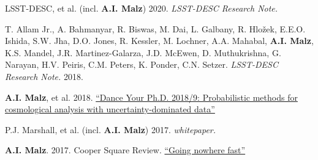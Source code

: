 \nopagebreak\begin{list}{}{\malzlist}
	
		\item LSST-DESC, et al. (incl. {\bf A.I. Malz}) 2020. {\em LSST-DESC Research Note.}  
	
	\item T. Allam Jr., A. Bahmanyar, R. Biswas, M. Dai, L. Galbany, R. Hlo{\v z}ek, E.E.O. Ishida, S.W. Jha, D.O. Jones, R. Kessler, M. Lochner, A.A. Mahabal, {\bf A.I. Malz}, K.S. Mandel, J.R. Martinez-Galarza, J.D. McEwen, D. Muthukrishna, G. Narayan, H.V. Peiris, C.M. Peters, K. Ponder, C.N. Setzer. {\em LSST-DESC Research Note.} 2018. 
	
	\item {\bf A.I. Malz}, et al. 2018. \href{https://youtu.be/vKs3PYqZWg8}{``Dance Your Ph.D. 2018/9: Probabilistic methods for cosmological analysis with uncertainty-dominated data''} 
	
		\item P.J. Marshall, et al. (incl. {\bf A.I. Malz}) 2017. {\em whitepaper.}  
	
	\item {\bf A.I. Malz}. 2017. Cooper Square Review. \href{http://coopersquarereview.org/post/going-nowhere-fast/}{``Going nowhere fast''} 
\end{list}


